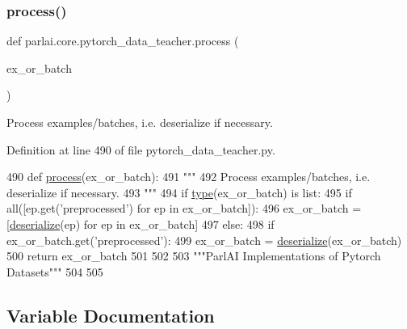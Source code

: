 \subsubsection{\texorpdfstring{process()}{process()}}
{\footnotesize\ttfamily def parlai.\+core.\+pytorch\+\_\+data\+\_\+teacher.\+process (\begin{DoxyParamCaption}\item[{}]{ex\+\_\+or\+\_\+batch }\end{DoxyParamCaption})}

\begin{DoxyVerb}Process examples/batches, i.e. deserialize if necessary.
\end{DoxyVerb}
 

Definition at line 490 of file pytorch\+\_\+data\+\_\+teacher.\+py.


\begin{DoxyCode}
490 \textcolor{keyword}{def }\hyperlink{namespaceparlai_1_1core_1_1pytorch__data__teacher_a7b71207eb86027bc93809c1e4d57f641}{process}(ex\_or\_batch):
491     \textcolor{stringliteral}{"""}
492 \textcolor{stringliteral}{    Process examples/batches, i.e. deserialize if necessary.}
493 \textcolor{stringliteral}{    """}
494     \textcolor{keywordflow}{if} \hyperlink{namespaceparlai_1_1agents_1_1tfidf__retriever_1_1build__tfidf_ad5dfae268e23f506da084a9efb72f619}{type}(ex\_or\_batch) \textcolor{keywordflow}{is} list:
495         \textcolor{keywordflow}{if} all([ep.get(\textcolor{stringliteral}{'preprocessed'}) \textcolor{keywordflow}{for} ep \textcolor{keywordflow}{in} ex\_or\_batch]):
496             ex\_or\_batch = [\hyperlink{namespaceparlai_1_1core_1_1pytorch__data__teacher_a0c6f08553514c14d037da194f9d112ae}{deserialize}(ep) \textcolor{keywordflow}{for} ep \textcolor{keywordflow}{in} ex\_or\_batch]
497     \textcolor{keywordflow}{else}:
498         \textcolor{keywordflow}{if} ex\_or\_batch.get(\textcolor{stringliteral}{'preprocessed'}):
499             ex\_or\_batch = \hyperlink{namespaceparlai_1_1core_1_1pytorch__data__teacher_a0c6f08553514c14d037da194f9d112ae}{deserialize}(ex\_or\_batch)
500     \textcolor{keywordflow}{return} ex\_or\_batch
501 
502 
503 \textcolor{stringliteral}{"""ParlAI Implementations of Pytorch Datasets"""}
504 
505 
\end{DoxyCode}


\subsection{Variable Documentation}
\mbox{\label{namespaceparlai_1_1core_1_1pytorch__data__teacher_a8a64b1f3378f7698020472b7e968cc8b}} 

